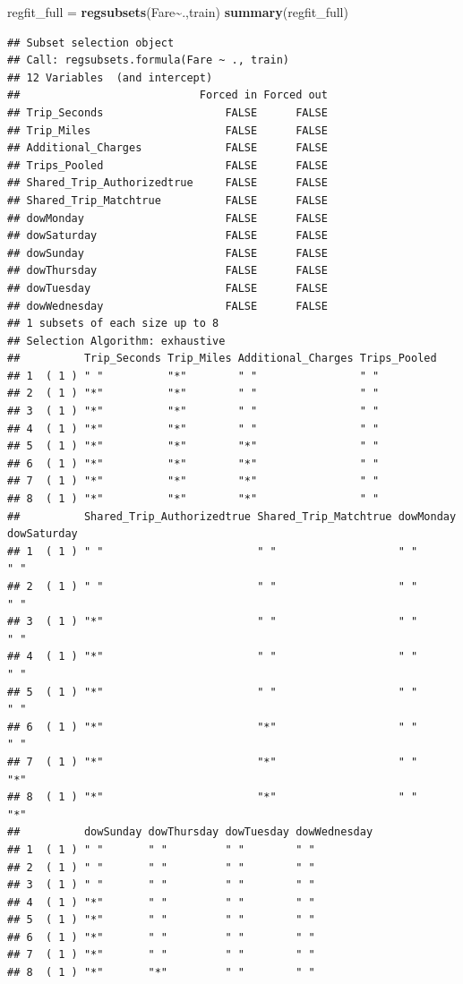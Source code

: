 \documentclass[
]{article}
\newenvironment{Shaded}{\begin{snugshade}}{\end{snugshade}}
\newcommand{\FunctionTok}[1]{\textcolor[rgb]{0.13,0.29,0.53}{\textbf{#1}}}
\newcommand{\NormalTok}[1]{#1}
\newcommand{\OtherTok}[1]{\textcolor[rgb]{0.56,0.35,0.01}{#1}}
\newcommand{\SpecialCharTok}[1]{\textcolor[rgb]{0.81,0.36,0.00}{\textbf{#1}}}
\begin{document}
\begin{Shaded}
\begin{Highlighting}[]
\NormalTok{regfit\_full }\OtherTok{=} \FunctionTok{regsubsets}\NormalTok{(Fare}\SpecialCharTok{\textasciitilde{}}\NormalTok{.,train)}
\FunctionTok{summary}\NormalTok{(regfit\_full)}
\end{Highlighting}
\end{Shaded}

\begin{verbatim}
## Subset selection object
## Call: regsubsets.formula(Fare ~ ., train)
## 12 Variables  (and intercept)
##                            Forced in Forced out
## Trip_Seconds                   FALSE      FALSE
## Trip_Miles                     FALSE      FALSE
## Additional_Charges             FALSE      FALSE
## Trips_Pooled                   FALSE      FALSE
## Shared_Trip_Authorizedtrue     FALSE      FALSE
## Shared_Trip_Matchtrue          FALSE      FALSE
## dowMonday                      FALSE      FALSE
## dowSaturday                    FALSE      FALSE
## dowSunday                      FALSE      FALSE
## dowThursday                    FALSE      FALSE
## dowTuesday                     FALSE      FALSE
## dowWednesday                   FALSE      FALSE
## 1 subsets of each size up to 8
## Selection Algorithm: exhaustive
##          Trip_Seconds Trip_Miles Additional_Charges Trips_Pooled
## 1  ( 1 ) " "          "*"        " "                " "         
## 2  ( 1 ) "*"          "*"        " "                " "         
## 3  ( 1 ) "*"          "*"        " "                " "         
## 4  ( 1 ) "*"          "*"        " "                " "         
## 5  ( 1 ) "*"          "*"        "*"                " "         
## 6  ( 1 ) "*"          "*"        "*"                " "         
## 7  ( 1 ) "*"          "*"        "*"                " "         
## 8  ( 1 ) "*"          "*"        "*"                " "         
##          Shared_Trip_Authorizedtrue Shared_Trip_Matchtrue dowMonday dowSaturday
## 1  ( 1 ) " "                        " "                   " "       " "        
## 2  ( 1 ) " "                        " "                   " "       " "        
## 3  ( 1 ) "*"                        " "                   " "       " "        
## 4  ( 1 ) "*"                        " "                   " "       " "        
## 5  ( 1 ) "*"                        " "                   " "       " "        
## 6  ( 1 ) "*"                        "*"                   " "       " "        
## 7  ( 1 ) "*"                        "*"                   " "       "*"        
## 8  ( 1 ) "*"                        "*"                   " "       "*"        
##          dowSunday dowThursday dowTuesday dowWednesday
## 1  ( 1 ) " "       " "         " "        " "         
## 2  ( 1 ) " "       " "         " "        " "         
## 3  ( 1 ) " "       " "         " "        " "         
## 4  ( 1 ) "*"       " "         " "        " "         
## 5  ( 1 ) "*"       " "         " "        " "         
## 6  ( 1 ) "*"       " "         " "        " "         
## 7  ( 1 ) "*"       " "         " "        " "         
## 8  ( 1 ) "*"       "*"         " "        " "
\end{verbatim}
\end{document}
